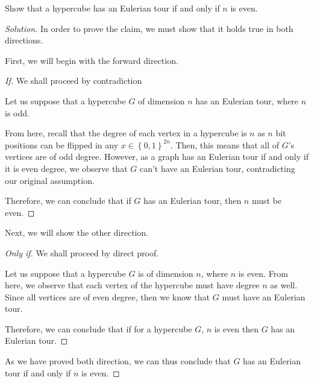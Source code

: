 \documentclass{article}
\newenvironment{solution}{\begin{proof}[Solution]}{\end{proof}}
\begin{document}
\begin{hw}
	Show that a hypercube has an Eulerian tour if and only if $n$ is even.
\end{hw}
\begin{solution}
	In order to prove the claim, we must show that it holds true in both directions.
	
	First, we will begin with the forward direction.
	\begin{proof}[If]
		We shall proceed by contradiction
		
		Let us suppose that a hypercube $G$ of dimension $n$ has an Eulerian tour, where $n$ is odd.
		
		From here, recall that the degree of each vertex in a hypercube is $n$ as $n$ bit positions can be flipped in any $x \in \left\{  0,1\right\}^{2n}$. Then, this means that all of $G$'s vertices are of odd degree. However, as a graph has an Eulerian tour if and only if it is even degree, we observe that $G$ can't have an Eulerian tour, contradicting our original assumption.
		
		Therefore, we can conclude that if $G$ has an Eulerian tour, then $n$ must be even.
	\end{proof}

	Next, we will show the other direction.
	\begin{proof}[Only if]
		We shall proceed by direct proof.
		
		Let us suppose that a hypercube $G$ is of dimension $n$, where $n$ is even. From here, we observe that each vertex of the hypercube must have degree $n$ as well. 
		Since all vertices are of even degree, then we know that $G$ must have an Eulerian tour.
		
		Therefore, we can conclude that if for a hypercube $G$, $n$ is even then $G$ has an Eulerian tour.
	\end{proof}

	As we have proved both direction, we can thus conclude that $G$ has an Eulerian tour if and only if $n$ is even.
\end{solution}
\end{document}
